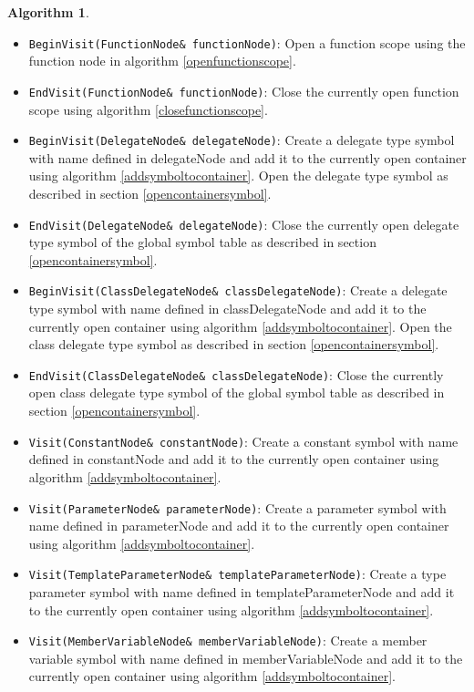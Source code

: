 \documentclass[a4paper,oneside,11pt]{book}
\theoremstyle{definition}
\newtheorem{algo}{Algorithm}[section]
\begin{document}
\begin{algo}
\begin{itemize}
\verb|Visit(TypedefNode& typedefNode)|:
Create a typedef symbol with name defined in typedefNode and
add it to the currently open container using algorithm \ref{addsymboltocontainer}.
\item
\verb|BeginVisit(FunctionNode& functionNode)|:
Open a function scope using the function node in algorithm \ref{openfunctionscope}.
\item
\verb|EndVisit(FunctionNode& functionNode)|:
Close the currently open function scope using algorithm \ref{closefunctionscope}.
\item
\verb|BeginVisit(DelegateNode& delegateNode)|:
Create a delegate type symbol with name defined in delegateNode and
add it to the currently open container using algorithm \ref{addsymboltocontainer}.
Open the delegate type symbol as described in section \ref{opencontainersymbol}.
\item
\verb|EndVisit(DelegateNode& delegateNode)|:
Close the currently open delegate type symbol of the global symbol table as described in section \ref{opencontainersymbol}.
\item
\verb|BeginVisit(ClassDelegateNode& classDelegateNode)|:
Create a delegate type symbol with name defined in classDelegateNode and
add it to the currently open container using algorithm \ref{addsymboltocontainer}.
Open the class delegate type symbol as described in section \ref{opencontainersymbol}.
\item
\verb|EndVisit(ClassDelegateNode& classDelegateNode)|:
Close the currently open class delegate type symbol of the global symbol table as described in section \ref{opencontainersymbol}.
\item
\verb|Visit(ConstantNode& constantNode)|:
Create a constant symbol with name defined in constantNode and
add it to the currently open container using algorithm \ref{addsymboltocontainer}.
\item
\verb|Visit(ParameterNode& parameterNode)|:
Create a parameter symbol with name defined in parameterNode and
add it to the currently open container using algorithm \ref{addsymboltocontainer}.
\item
\verb|Visit(TemplateParameterNode& templateParameterNode)|:
Create a type parameter symbol with name defined in templateParameterNode and
add it to the currently open container using algorithm \ref{addsymboltocontainer}.
\item
\verb|Visit(MemberVariableNode& memberVariableNode)|:
Create a member variable symbol with name defined in memberVariableNode and
add it to the currently open container using algorithm \ref{addsymboltocontainer}.

\end{itemize}
\end{algo}
\end{document}
